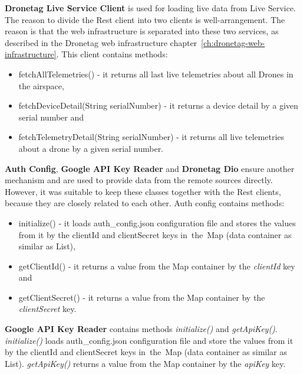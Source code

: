 \textbf{Dronetag Live Service Client} is used for loading live data from Live Service.
The reason to divide the Rest client into two clients is well-arrangement.
The reason is that the web infrastructure is separated into these two services, as described in the Dronetag web infrastructure chapter~\ref{ch:dronetag-web-infrastructure}.
This client contains methods:
\begin{itemize}
    \item fetchAllTelemetries() - it returns all last live telemetries about all Drones in the airspace,
    \item fetchDeviceDetail(String serialNumber) - it returns a device detail by a given serial number and
    \item fetchTelemetryDetail(String serialNumber) - it returns all live telemetries about a drone by a given serial number.
\end{itemize}

\textbf{Auth Config}, \textbf{Google API Key Reader} and \textbf{Dronetag Dio} ensure another mechanism and are used to provide data from the remote sources directly.
However, it was suitable to keep these classes together with the Rest clients, because they are closely related to each other.
Auth config contains methods:
\begin{itemize}
    \item initialize() - it loads auth\_config.json configuration file and stores the values from it by the clientId and clientSecret keys in~the~Map (data container as similar as List),
    \item getClientId() - it returns a value from the Map container by the \textit{clientId} key and
    \item getClientSecret() - it returns a value from the Map container by the \textit{clientSecret} key.
\end{itemize}
\textbf{Google API Key Reader} contains methods \textit{initialize()} and \textit{getApiKey()}.
\textit{initialize()} loads auth\_config.json configuration file and store the values from it by the clientId and clientSecret keys in~the~Map (data container as similar as List).
\textit{getApiKey()} returns a value from the Map container by the \textit{apiKey} key.
